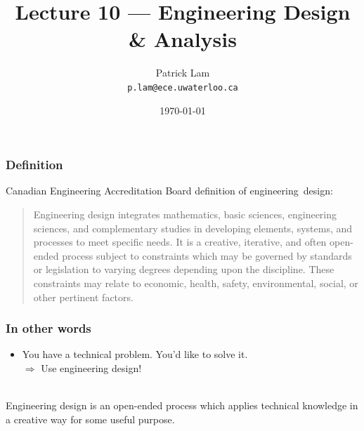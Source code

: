 

\usepackage{tikz}
\usetikzlibrary{arrows,automata,shapes,matrix,chains,scopes,positioning,calc}


\title{Lecture 10 --- Engineering Design \& Analysis}

\author{Patrick Lam \\ \small \texttt{p.lam@ece.uwaterloo.ca}}
\date{\today}





\begin{frame}
  \titlepage
\end{frame}

\begin{frame}
\frametitle{Definition}

Canadian Engineering Accreditation Board definition of
engineering~design:

{\small
\begin{quote}
Engineering design integrates mathematics, basic sciences, engineering sciences, and complementary studies in developing elements, systems, and processes to meet specific needs.  It is a creative, iterative, and often open-ended process subject to constraints which may be governed by standards or legislation to varying degrees depending upon the discipline.  These constraints may relate to economic, health, safety, environmental, social, or other pertinent factors.
\end{quote}
}

\end{frame}

\begin{frame}
\frametitle{In other words}

\large
\begin{changemargin}{1.4cm}
\begin{itemize}
\item You have a technical problem. You'd like to solve it.\\
 $\Rightarrow$ Use engineering design!
\end{itemize}
~\\

Engineering design is an open-ended process which applies technical knowledge in a creative
way for some useful purpose.
\end{changemargin}

\end{frame}

